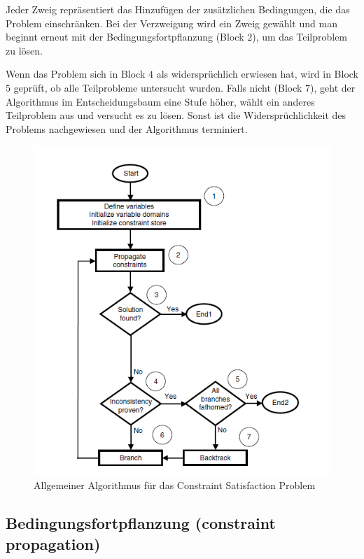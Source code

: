 Jeder Zweig repräsentiert das Hinzufügen der zusätzlichen Bedingungen, die das Problem einschränken. Bei der Verzweigung wird ein Zweig gewählt und man beginnt erneut mit der Bedingungsfortpflanzung (Block $2$), um das Teilproblem zu lösen.

Wenn das Problem sich in Block $4$ als widersprüchlich erwiesen hat, wird in Block $5$ geprüft, ob alle Teilprobleme untersucht wurden. Falls nicht (Block $7$), geht der Algorithmus im Entscheidungsbaum eine Stufe höher, wählt ein anderes Teilproblem aus und versucht es zu lösen. Sonst ist die Widersprüchlichkeit des Problems nachgewiesen und der Algorithmus terminiert.

\begin{figure}[h]
	\centering
	\includegraphics[scale=0.9]{fig/CSPalgorithm.png}
	\caption{Allgemeiner Algorithmus für das Constraint Satisfaction Problem }
	\label{fig:CSPalgorithm}
\end{figure}

\FloatBarrier

\subsection{Bedingungsfortpflanzung (constraint propagation)}

